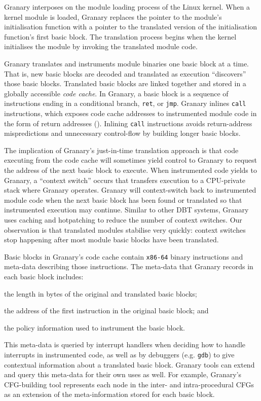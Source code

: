 \documentclass[preprint]{sigplanconf}
\begin{document}
Granary interposes on the module loading process of the Linux kernel. When a kernel module is loaded, Granary replaces the pointer to the module's initialisation function with a pointer to the translated version of the initialisation function's first basic block. The translation process begins when the kernel initialises the module by invoking the translated module code.

Granary translates and instruments module binaries one basic block at a time. That is, new basic blocks are decoded and translated as execution ``discovers'' those basic blocks. Translated basic blocks are linked together and stored in a globally accessible \emph{code cache}. In Granary, a basic block is a sequence of instructions ending in a conditional branch, \texttt{ret}, or \texttt{jmp}. Granary inlines \texttt{call} instructions, which exposes code cache addresses to instrumented module code in the form of return addresses (). Inlining \texttt{call} instructions avoids return-address mispredictions and unnecessary control-flow by building longer basic blocks.

The implication of Granary's just-in-time translation approach is that code executing from the code cache will sometimes yield control to Granary to request the address of the next basic block to execute. When instrumented code yields to Granary, a ``context switch'' occurs that transfers execution to a CPU-private stack where Granary operates. Granary will context-switch back to instrumented module code when the next basic block has been found or translated so that instrumented execution may continue. Similar to other DBT systems, Granary uses caching and hotpatching to reduce the number of context switches. Our observation is that translated modules stabilise very quickly: context switches stop happening after most module basic blocks have been translated.

Basic blocks in Granary's code cache contain \texttt{x86-64} binary instructions and meta-data describing those instructions. The meta-data that Granary records in each basic block includes: \begin{inparaenum}[i)]
	\item the length in bytes of the original and translated basic blocks;
	\item the address of the first instruction in the original basic block; and
	\item the policy information used to instrument the basic block.
\end{inparaenum} This meta-data is queried by interrupt handlers when deciding how to handle interrupts in instrumented code, as well as by debuggers (e.g. \texttt{gdb}) to give contextual information about a translated basic block. Granary tools can extend and query this meta-data for their own uses as well. For example, Granary's CFG-building tool represents each node in the inter- and intra-procedural CFGs as an extension of the meta-information stored for each basic block.
\end{document}
